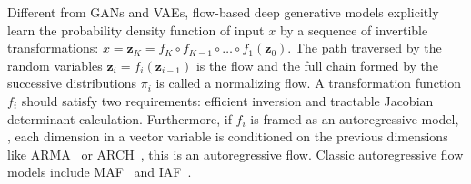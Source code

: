 Different from GANs and VAEs, flow-based deep generative models explicitly learn the probability density function of input $x$ by a sequence of invertible transformations: $x = \mathbf{z}_K = f_K \circ f_{K-1} \circ \dots \circ f_1 (\mathbf{z}_0)$.
The path traversed by the random variables $\mathbf{z}_i = f_i(\mathbf{z}_{i-1})$ is the flow and the full chain formed by the successive distributions $\pi_i$ is called a normalizing flow. A transformation function $f_i$ should satisfy two requirements: efficient inversion and tractable Jacobian determinant calculation.
Furthermore, if $f_i$ is framed as an autoregressive model, \ie, each dimension in a vector variable is conditioned on the previous dimensions like ARMA~\cite{box2011time} or ARCH~\cite{engle1982autoregressive}, this is an autoregressive flow. Classic autoregressive flow models include MAF~\cite{papamakarios2017masked} and IAF~\cite{kingma2016improved}.

